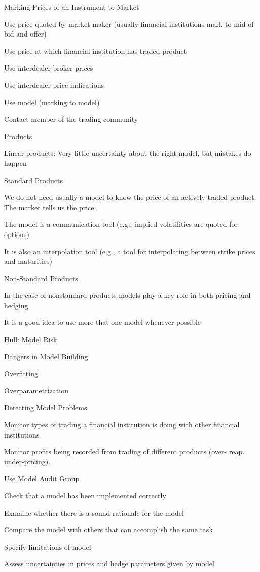 {Marking Prices of an Instrument to Market}
\item<1->
Use price quoted by market maker (usually financial institutions mark to mid of bid and offer)
\item<2-> Use price at which financial institution has traded product
\item<3-> Use interdealer broker prices
\item<4-> Use interdealer price indications
\item<5-> Use model (marking to model)
\item<6-> Contact member of the trading community

{Products}
\item<1-> Linear products: Very little uncertainty about the right model, but mistakes do happen
\item<2-> Standard Products
\item We do not need usually a model to know the price of an actively traded product. The market tells us the price.
\item The model is a communication tool (e.g., implied volatilities are quoted for options)
\item It is also an interpolation tool (e.g., a tool for interpolating between strike prices and maturities)
\item<3-> Non-Standard Products
\item In the case of nonstandard products models play a key role in both pricing and hedging
\item It is a good idea to use more that one model whenever possible

{Hull: Model Risk}
\item<1->  Dangers in Model Building
\item Overfitting
\item Overparametrization
\item<2-> Detecting Model Problems
\item<1-> Monitor types of trading a financial institution is doing with other financial institutions
\item<2-> Monitor profits being recorded from trading of different products (over- reap. under-pricing).
\item<3-> Use Model Audit Group
\item Check that a model has been implemented correctly
\item Examine whether there is a sound rationale for the model
\item Compare the model with others that can accomplish the same task
\item Specify limitations of model
\item Assess uncertainties in prices and hedge parameters given by model

